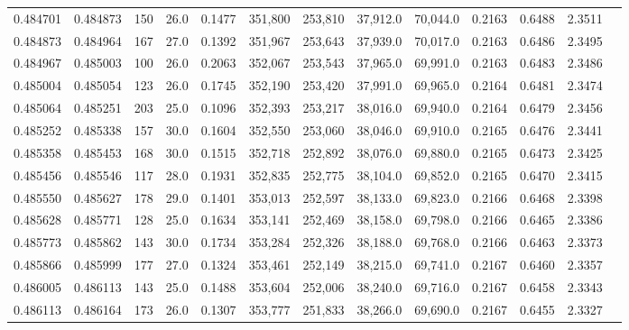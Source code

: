 \begin{tabular}{rrrrrrrrrrrrr}
0.484701 & 0.484873 &   150 & 26.0 &                                     0.1477 & 351,800 & 253,810 &  37,912.0 &  70,044.0 & 0.2163 & 0.6488 & 2.3511 \\
0.484873 & 0.484964 &   167 & 27.0 &                                     0.1392 & 351,967 & 253,643 &  37,939.0 &  70,017.0 & 0.2163 & 0.6486 & 2.3495 \\
0.484967 & 0.485003 &   100 & 26.0 &                                     0.2063 & 352,067 & 253,543 &  37,965.0 &  69,991.0 & 0.2163 & 0.6483 & 2.3486 \\
0.485004 & 0.485054 &   123 & 26.0 &                                     0.1745 & 352,190 & 253,420 &  37,991.0 &  69,965.0 & 0.2164 & 0.6481 & 2.3474 \\
0.485064 & 0.485251 &   203 & 25.0 &                                     0.1096 & 352,393 & 253,217 &  38,016.0 &  69,940.0 & 0.2164 & 0.6479 & 2.3456 \\
0.485252 & 0.485338 &   157 & 30.0 &                                     0.1604 & 352,550 & 253,060 &  38,046.0 &  69,910.0 & 0.2165 & 0.6476 & 2.3441 \\
0.485358 & 0.485453 &   168 & 30.0 &                                     0.1515 & 352,718 & 252,892 &  38,076.0 &  69,880.0 & 0.2165 & 0.6473 & 2.3425 \\
0.485456 & 0.485546 &   117 & 28.0 &                                     0.1931 & 352,835 & 252,775 &  38,104.0 &  69,852.0 & 0.2165 & 0.6470 & 2.3415 \\
0.485550 & 0.485627 &   178 & 29.0 &                                     0.1401 & 353,013 & 252,597 &  38,133.0 &  69,823.0 & 0.2166 & 0.6468 & 2.3398 \\
0.485628 & 0.485771 &   128 & 25.0 &                                     0.1634 & 353,141 & 252,469 &  38,158.0 &  69,798.0 & 0.2166 & 0.6465 & 2.3386 \\
0.485773 & 0.485862 &   143 & 30.0 &                                     0.1734 & 353,284 & 252,326 &  38,188.0 &  69,768.0 & 0.2166 & 0.6463 & 2.3373 \\
0.485866 & 0.485999 &   177 & 27.0 &                                     0.1324 & 353,461 & 252,149 &  38,215.0 &  69,741.0 & 0.2167 & 0.6460 & 2.3357 \\
0.486005 & 0.486113 &   143 & 25.0 &                                     0.1488 & 353,604 & 252,006 &  38,240.0 &  69,716.0 & 0.2167 & 0.6458 & 2.3343 \\
0.486113 & 0.486164 &   173 & 26.0 &                                     0.1307 & 353,777 & 251,833 &  38,266.0 &  69,690.0 & 0.2167 & 0.6455 & 2.3327 \\

\end{tabular}
